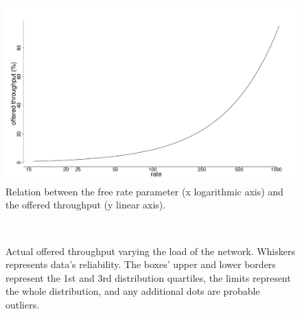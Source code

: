\documentclass[conference]{IEEEtran}
\begin{document}
\begin{figure}[t]
    \centering
    \includegraphics[width=\columnwidth]{graphs/Sim1}
    \caption{Relation between the free rate parameter (x logarithmic axis) and the offered throughput (y linear axis).}
    \label{grph:sim1}
\end{figure}

\begin{figure}[t]
    \centering
    \\
    \caption{Actual offered throughput varying the load of the network. Whiskers represents data’s reliability. The boxes’ upper and lower borders represent the 1st and 3rd distribution quartiles, the limits represent the whole distribution, and any additional dots are probable outliers.}
    \label{grph:sim24}
\end{figure}
\end{document}
